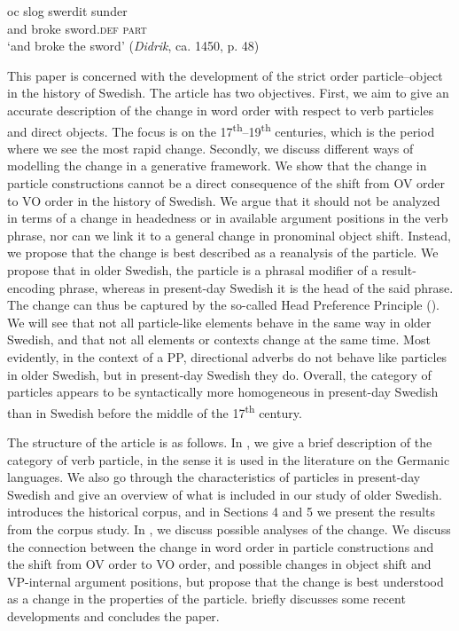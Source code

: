 \documentclass[output=paper]{langscibook}
\begin{document}
\ex
\gll oc    slog     swerdit     sunder\\
      and  broke   sword\textsc{.def}   \textsc{part}\\
  \glt  ‘and broke the sword’ (\textit{Didrik}, ca. 1450, p. 48)

\z
\z

This paper is concerned with the development of the strict order particle–object in the history of Swedish. The article has two objectives. First, we aim to give an accurate description of the change in word order with respect to verb particles and direct objects. The focus is on the 17\textsuperscript{th}--19\textsuperscript{th} centuries, which is the period where we see the most rapid change. Secondly, we discuss different ways of modelling the change in a generative framework. We show that the change in particle constructions cannot be a direct consequence of the shift from OV order to VO order in the history of Swedish. We argue that it should not be analyzed in terms of a change in headedness or in available argument positions in the verb phrase, nor can we link it to a general change in pronominal object shift. Instead, we propose that the change is best described as a reanalysis of the particle. We propose that in older Swedish, the particle is a phrasal modifier of a result-encoding phrase, whereas in present-day Swedish it is the head of the said phrase. The change can thus be captured by the so-called Head Preference Principle (\citealt{van_Gelderen2004}). We will see that not all particle-like elements behave in the same way in older Swedish, and that not all elements or contexts change at the same time. Most evidently, in the context of a PP, directional adverbs do not behave like particles in older Swedish, but in present-day Swedish they do. Overall, the category of particles appears to be syntactically more homogeneous in present-day Swedish than in Swedish before the middle of the 17\textsuperscript{th} century. 



The structure of the article is as follows. In , we give a brief description of the category of verb particle, in the sense it is used in the literature on the Germanic languages. We also go through the characteristics of particles in present-day Swedish and give an overview of what is included in our study of older Swedish.  introduces the historical corpus, and in Sections 4 and 5 we present the results from the corpus study. In , we discuss possible analyses of the change. We discuss the connection between the change in word order in particle constructions and the shift from OV order to VO order, and possible changes in object shift and VP-internal argument positions, but propose that the change is best understood as a change in the properties of the particle.  briefly discusses some recent developments and concludes the paper.
\end{document}

